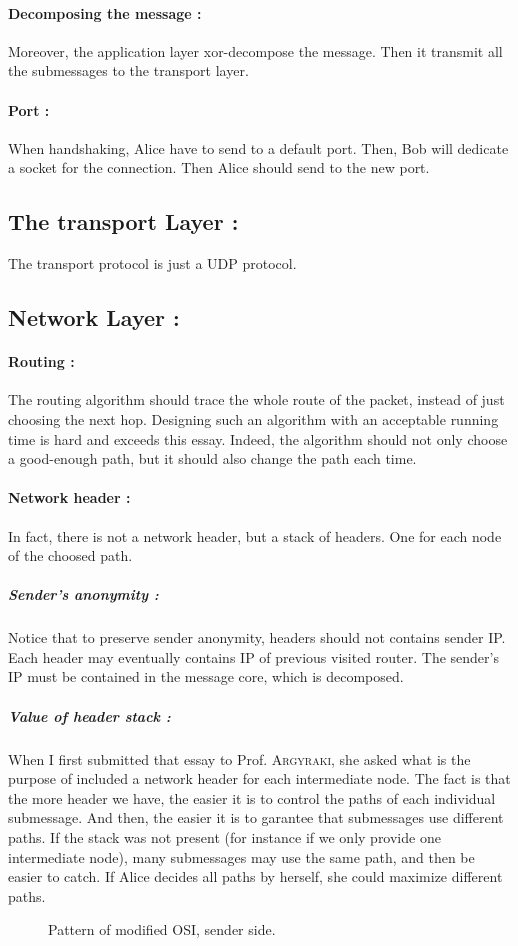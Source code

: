 \documentclass[a4paper, onecolumn, 10pt]{article}
\numberwithin{equation}{section}
\begin{document}
\paragraph{Decomposing the message :}
Moreover, the application layer xor-decompose the message. Then it transmit all the submessages to the transport layer.
\paragraph{Port :}
When handshaking, Alice have to send to a default port. Then, Bob will dedicate a socket for the connection. Then Alice should send to the new port.
\subsection{The transport Layer :}
The transport protocol is just a UDP protocol.
\subsection{Network Layer :}
\paragraph{Routing :}
The routing algorithm should trace the whole route of the packet, instead of just choosing the next hop. Designing such an algorithm with an acceptable running time is hard and exceeds this essay. Indeed, the algorithm should not only choose a good-enough path, but it should also change the path each time. 
\paragraph{Network header :}
In fact, there is not a network header, but a stack of headers. One for each node of the choosed path.
\subparagraph{Sender's anonymity :}
Notice that to preserve sender anonymity, headers should not contains sender IP. Each header may eventually contains IP of previous visited router. The sender's IP must be contained in the message core, which is decomposed.
\subparagraph{Value of header stack :}
When I first submitted that essay to Prof. \textsc{Argyraki}, she asked what is the purpose of included a network header for each intermediate node. The fact is that the more header we have, the easier it is to control the paths of each individual submessage. And then, the easier it is to garantee that submessages use different paths. If the stack was not present (for instance if we only provide one intermediate node), many submessages may use the same path, and then be easier to catch. If Alice decides all paths by herself, she could maximize different paths.
\begin{figure}
  \centering
  \begingroup
  
  \endgroup
  \caption{Pattern of modified OSI, sender side.}
  \label{fig:OSImodified}
\end{figure}
\end{document}
